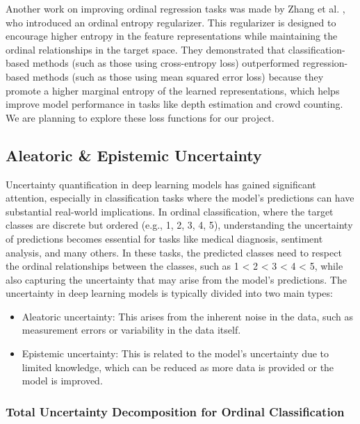 \documentclass{report}
\begin{document}
Another work on improving ordinal regression tasks was made by Zhang et al. \cite{zhang2023improvingdeepregressionordinal}, who introduced an ordinal entropy regularizer. This regularizer is designed to encourage higher entropy in the feature representations while maintaining the ordinal relationships in the target space. They demonstrated that classification-based methods (such as those using cross-entropy loss) outperformed regression-based methods (such as those using mean squared error loss) because they promote a higher marginal entropy of the learned representations, which helps improve model performance in tasks like depth estimation and crowd counting.\\
We are planning to explore these loss functions for our project.

\subsection*{Aleatoric \& Epistemic Uncertainty}

Uncertainty quantification in deep learning models has gained significant attention, especially in classification tasks where the model’s predictions can have substantial real-world implications. In ordinal classification, where the target classes are discrete but ordered (e.g., {1, 2, 3, 4, 5}), understanding the uncertainty of predictions becomes essential for tasks like medical diagnosis, sentiment analysis, and many others. In these tasks, the predicted classes need to respect the ordinal relationships between the classes, such as 1 < 2 < 3 < 4 < 5, while also capturing the uncertainty that may arise from the model’s predictions. The uncertainty in deep learning models is typically divided into two main types:

\begin{itemize}
    \item Aleatoric uncertainty: This arises from the inherent noise in the data, such as measurement errors or variability in the data itself.
    \item Epistemic uncertainty: This is related to the model's uncertainty due to limited knowledge, which can be reduced as more data is provided or the model is improved.
\end{itemize}

\subsubsection*{Total Uncertainty Decomposition for Ordinal Classification}
\end{document}
